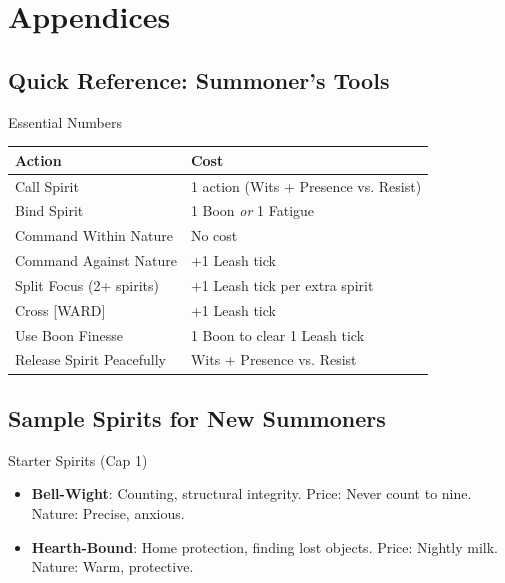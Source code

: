 \documentclass[11pt,twoside]{book}
\begin{document}
\appendix
\part{Appendices}

\chapter{Quick Reference: Summoner's Tools}
\begin{mechbox}{Essential Numbers}
  \begin{tabular}{ll}
    \toprule
    \textbf{Action} & \textbf{Cost} \\
    \midrule
    Call Spirit & 1 action (Wits + Presence vs. Resist) \\
    Bind Spirit & 1 Boon \textit{or} 1 Fatigue \\
    Command Within Nature & No cost \\
    Command Against Nature & +1 Leash tick \\
    Split Focus (2+ spirits) & +1 Leash tick per extra spirit \\
    Cross [WARD] & +1 Leash tick \\
    Use Boon Finesse & 1 Boon to clear 1 Leash tick \\
    Release Spirit Peacefully & Wits + Presence vs. Resist \\
    \bottomrule
  \end{tabular}
\end{mechbox}

\chapter{Sample Spirits for New Summoners}
\begin{mechbox}{Starter Spirits (Cap 1)}
  \begin{itemize}
    \item \textbf{Bell-Wight}: Counting, structural integrity. Price: Never count to nine. Nature: Precise, anxious.
    \item \textbf{Hearth-Bound}: Home protection, finding lost objects. Price: Nightly milk. Nature: Warm, protective.
  \end{itemize}
\end{mechbox}
\end{document}
